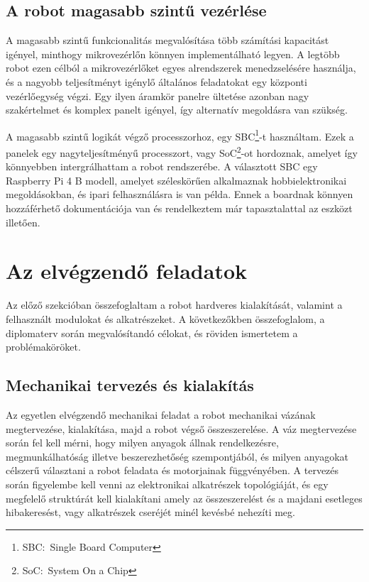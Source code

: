 \subsection{A robot magasabb szintű vezérlése}
A magasabb szintű funkcionalitás megvalósítása több számítási kapacitást igényel,
minthogy mikrovezérlőn könnyen implementálható legyen. A legtöbb robot ezen
célból a mikrovezérlőket egyes alrendszerek menedzselésére használja, és a
nagyobb teljesítményt igénylő általános feladatokat egy központi vezérlőegység
végzi. Egy ilyen áramkör panelre ültetése azonban nagy szakértelmet és komplex
panelt igényel, így alternatív megoldásra van szükség.

A magasabb szintű logikát végző processzorhoz, egy SBC\footnote{SBC:~Single Board
Computer}-t használtam. Ezek a panelek egy nagyteljesítményű processzort, vagy
SoC\footnote{SoC:~System On a Chip}-ot hordoznak, amelyet így könnyebben
intergrálhattam a robot rendszerébe. A választott SBC egy Raspberry Pi 4 B
modell, amelyet széleskörűen alkalmaznak hobbielektronikai megoldásokban, és
ipari felhasználásra is van példa. Ennek a boardnak könnyen hozzáférhető
dokumentációja van és rendelkeztem már tapasztalattal az eszközt illetően.

\section{Az elvégzendő feladatok}

Az előző szekcióban összefoglaltam a robot hardveres kialakítását, valamint a
felhasznált modulokat és alkatrészeket. A következőkben összefoglalom, a
diplomaterv során megvalósítandó célokat, és röviden ismertetem a
problémaköröket.

\subsection{Mechanikai tervezés és kialakítás}

Az egyetlen elvégzendő mechanikai feladat a robot mechanikai vázának
megtervezése, kialakítása, majd a robot végső összeszerelése. A váz megtervezése
során fel kell mérni, hogy milyen anyagok állnak rendelkezésre, megmunkálhatóság
illetve beszerezhetőség szempontjából, és milyen anyagokat célszerű választani a
robot feladata és motorjainak függvényében. A tervezés során figyelembe kell
venni az elektronikai alkatrészek topológiáját, és egy megfelelő struktúrát kell
kialakítani amely az összeszerelést és a majdani esetleges hibakeresést, vagy
alkatrészek cseréjét minél kevésbé nehezíti meg.

